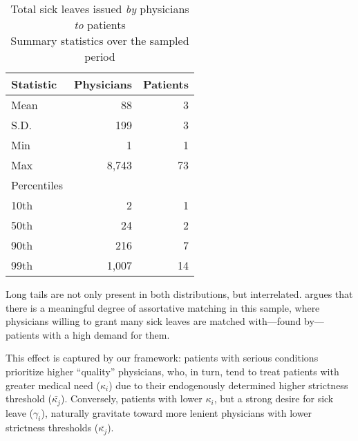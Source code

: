 \documentclass[../main.tex]{subfiles}
\begin{document}
\vspace{1em}
\begin{table}[h]
    \centering
    \small
    \begin{tabular}{lrr}
    \toprule
    Statistic & Physicians & Patients \\
    \midrule
    Mean      & 88     & 3       \\
    S.D.     & 199     & 3       \\
    Min       & 1      & 1      \\
    Max       & 8,743    & 73     \\
    Percentiles & & \\
    \hspace{1em}10th     & 2       & 1       \\
    \hspace{1em}50th  & 24    & 2       \\
    \hspace{1em}90th    & 216     & 7       \\
    \hspace{1em}99th     & 1,007    & 14      \\
    \bottomrule
    \end{tabular}
    \caption{Total sick leaves issued \textit{by} physicians \textit{to} patients \\ Summary statistics over the sampled period}
    \label{tab:stats}
\end{table}
\vspace{1em}

Long tails are not only present in both distributions, but interrelated. \cite{oteiza} argues that there is a meaningful degree of assortative matching in this sample, where physicians willing to grant many sick leaves are matched with—found by—patients with a high demand for them.

This effect is captured by our framework: patients with serious conditions prioritize higher ``quality'' physicians, who, in turn, tend to treat patients with greater medical need ($\kappa_i$) due to their endogenously determined higher strictness threshold ($\bar{\kappa_j}$). Conversely, patients with lower $\kappa_i$, but a strong desire for sick leave ($\gamma_i$), naturally gravitate toward more lenient physicians with lower strictness thresholds ($\bar{\kappa_j}$).
\end{document}
